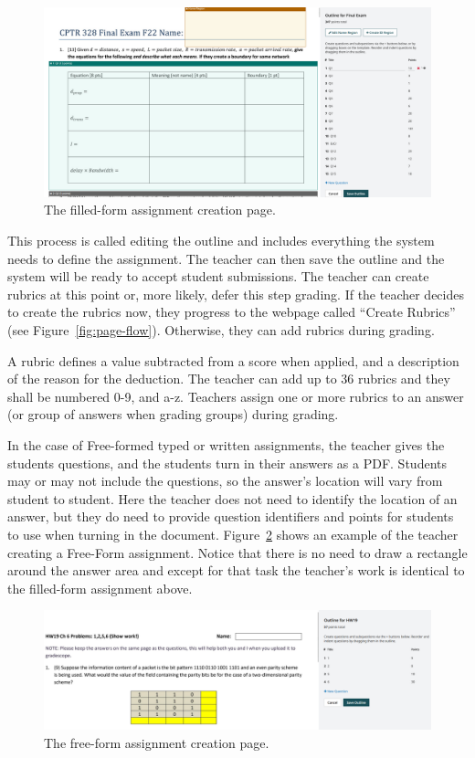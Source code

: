 \documentclass[ms,twoside,print]{nuthesis}
\begin{document}
\begin{figure}[htb]
    \centering
    \includegraphics[width=\textwidth]{images/filled-form-creation.png}
    \caption{The filled-form assignment creation page.}
    \label{fig:filled-form}
\end{figure}

This process is called editing the outline and includes everything the system needs to define the assignment. The teacher can then save the outline and the system will be ready to accept student submissions. The teacher can create rubrics at this point or, more likely, defer this step grading. If the teacher decides to create the rubrics now, they progress to the webpage called ``Create Rubrics'' (see Figure~\ref{fig:page-flow}). Otherwise, they can add rubrics during grading.

A rubric defines a value subtracted from a score when applied, and a description of the reason for the deduction. The teacher can add up to 36 rubrics and they shall be numbered 0-9, and a-z. Teachers assign one or more rubrics to an answer (or group of answers when grading groups) during grading.  

In the case of Free-formed typed or written assignments, the teacher gives the students questions, and the students turn in their answers as a PDF. Students may or may not include the questions, so the answer's location will vary from student to student. Here the teacher does not need to identify the location of an answer, but they do need to provide question identifiers and points for students to use when turning in the document. Figure~\ref{fig:free-form} shows an example of the teacher creating a Free-Form assignment. Notice that there is no need to draw a rectangle around the answer area and except for that task the teacher's work is identical to the filled-form assignment above.

\begin{figure}[htb]
    \centering
    \includegraphics[width=\textwidth]{images/free-form-creation.png}
    \caption{The free-form assignment creation page.}
    \label{fig:free-form}
\end{figure}
\end{document}

